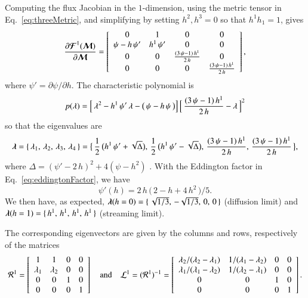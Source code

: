 \documentclass[11pt,letterpaper,twoside,english,final]{article}
\begin{document}
Computing the flux Jacobian in the $1$-dimension, using the metric tensor in Eq.~\eqref{eq:threeMetric}, and simplifying by setting $h^{2},h^{3}=0$ so that $h^{1}h_{1}=1$, gives
\begin{equation}
  \frac{\partial \boldsymbol{\mathcal{F}}^{1}(\boldsymbol{\mathcal{M}})}{\partial \boldsymbol{\mathcal{M}}}
  =\left[
  \begin{array}{cccc}
    0 & 1 & 0 & 0 \\
    \psi-h\,\psi' & h^{1}\,\psi' & 0 & 0 \\
    0 & 0 & \frac{(3\,\psi-1)\,h^{1}}{2\,h} & 0 \\
    0 & 0 & 0 & \frac{(3\,\psi-1)\,h^{1}}{2\,h}
  \end{array}
  \right],
\end{equation}
where $\psi'=\partial\psi/\partial h$.  
The characteristic polynomial is
\begin{equation}
  p(\lambda)=\Big[\,\lambda^{2}-h^{1}\,\psi'\,\lambda-\big(\,\psi-h\,\psi\,\big)\Big]\,\Big[\,\frac{(3\,\psi-1)\,h^{1}}{2\,h}-\lambda\,\Big]^{2}
\end{equation}
so that the eigenvalues are
\begin{equation}
  \boldsymbol{\lambda}
  =\{\,\lambda_{1},\,\lambda_{2},\,\lambda_{3},\,\lambda_{4}\,\}
  =\big\{\,\frac{1}{2}\,\big(h^{1}\,\psi'+\sqrt{\Delta}\big),\,\frac{1}{2}\,\big(h^{1}\,\psi'-\sqrt{\Delta}\big),\,\frac{(3\,\psi-1)\,h^{1}}{2\,h},\,\frac{(3\,\psi-1)\,h^{1}}{2\,h}\,\big\},
\end{equation}
where $\Delta=(\psi'-2\,h)^{2}+4(\psi-h^{2})$ \citep[cf.][]{pons_etal_2000}.  
With the Eddington factor in Eq.~\eqref{eq:eddingtonFactor}, we have
\begin{equation}
  \psi'(h)=2\,h\,\big(\,2-h+4\,h^{2}\,\big)/5.  
\end{equation}
We then have, as expected, $\boldsymbol{\lambda}(h=0)=\{\,\sqrt{1/3},\,-\sqrt{1/3},\,0,\,0\,\}$ (diffusion limit) and $\boldsymbol{\lambda}(h=1)=\{\,h^{1},\,h^{1},\,h^{1},\,h^{1}\,\}$ (streaming limit).  

The corresponding eigenvectors are given by the columns and rows, respectively of the matrices
\begin{equation}
  \mathcal{R}^{1}
  =\left[
  \begin{array}{cccc}
    1 & 1 & 0 & 0 \\
    \lambda_{1} & \lambda_{2} & 0 & 0 \\
    0 & 0 & 1 & 0 \\
    0 & 0 & 0 & 1
  \end{array}
  \right]
  \quad\text{and}\quad
  \mathcal{L}^{1}=(\mathcal{R}^{1})^{-1}
  =\left[
  \begin{array}{cccc}
  \lambda_{2}/(\lambda_{2}-\lambda_{1}) & 1/(\lambda_{1}-\lambda_{2}) & 0 & 0 \\
  \lambda_{1}/(\lambda_{1}-\lambda_{2}) & 1/(\lambda_{2}-\lambda_{1}) & 0 & 0 \\
  0 & 0 & 1 & 0 \\
  0 & 0 & 0 & 1
  \end{array}
  \right].  
\end{equation}
\end{document}
